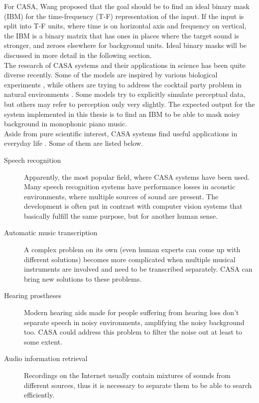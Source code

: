 For CASA, Wang \cite{Wang2006} proposed that the goal should be to find an ideal binary mask (IBM) for the time-frequency (T-F) representation of the input. If the input is split into T-F units, where time is on horizontal axis and frequency on vertical, the IBM is a binary matrix that has ones in places where the target sound is stronger, and zeroes elsewhere for background units. Ideal binary masks will be discussed in more detail in the following section.\\

The research of CASA systems and their applications in science \cite{Szabo2016} has been quite diverse recently. Some of the models are inspired by various biological experiments \cite{Wang2008}\cite{Boes2011}, while others are trying to address the cocktail party problem in natural environments \cite{Elhilali2008}. Some models try to explicitly simulate perceptual data, but others may refer to perception only very slightly. The expected output for the system implemented in this thesis is to find an IBM to be able to mask noisy background in monophonic piano music.\\

Aside from pure scientific interest, CASA systems find useful applications in everyday life \cite{Wang2006}. Some of them are listed below.

\begin{description}
	\item[Speech recognition] Apparently, the most popular field, where CASA systems have been used. Many speech recognition systems have performance losses in acoustic environments, where multiple sources of sound are present. The development is often put in contrast with computer vision systems that basically fulfill the same purpose, but for another human sense.
	\item[Automatic music transcription] A complex problem on its own (even human experts can come up with different solutions) becomes more complicated when multiple musical instruments are involved and need to be transcribed separately. CASA can bring new solutions to these problems.
	\item[Hearing prostheses] Modern hearing aids made for people suffering from hearing loss don't separate speech in noisy environments, amplifying the noisy background too. CASA could address this problem to filter the noise out at least to some extent.
	\item[Audio information retrieval] Recordings on the Internet usually contain mixtures of sounds from different sources, thus it is necessary to separate them to be able to search efficiently.
\end{description}

